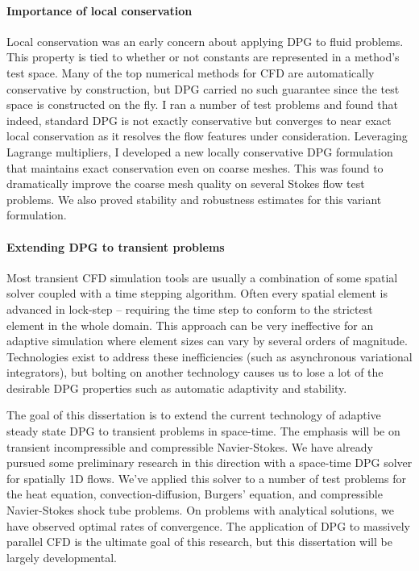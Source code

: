 \documentclass[letterpaper]{article}
\begin{document}
\paragraph{Importance of local conservation}
Local conservation was an early concern about applying DPG to fluid problems. 
This property is tied to whether or not constants are represented in a method's test space.
Many of the top numerical methods for CFD are automatically conservative by construction, 
but DPG carried no such guarantee since the test space is constructed on the fly.
I ran a number of test problems and found that indeed, standard DPG is not exactly conservative but converges to near exact local conservation 
as it resolves the flow features under consideration.
Leveraging Lagrange multipliers, I developed a new locally conservative DPG formulation\cite{Ellis2013Report} 
that maintains exact conservation even on coarse meshes.
This was found to dramatically improve the coarse mesh quality on several Stokes flow test problems.
We also proved stability and robustness estimates for this variant formulation.

\paragraph{Extending DPG to transient problems}
Most transient CFD simulation tools are usually a combination of some spatial solver coupled with a time stepping algorithm.
Often every spatial element is advanced in lock-step -- requiring the time step to conform to the strictest element in the whole domain.
This approach can be very ineffective for an adaptive simulation where element sizes can vary by several orders of magnitude.
Technologies exist to address these inefficiencies (such as asynchronous variational integrators\cite{Lew2003}), but bolting on another technology
causes us to lose a lot of the desirable DPG properties such as automatic adaptivity and stability.

The goal of this dissertation is to extend the current technology of adaptive steady state DPG to transient problems in space-time.
The emphasis will be on transient incompressible and compressible Navier-Stokes.
We have already pursued some preliminary research in this direction with a space-time DPG solver for spatially 1D flows.
We've applied this solver to a number of test problems for the heat equation, convection-diffusion, Burgers' equation, 
and compressible Navier-Stokes shock tube problems.
On problems with analytical solutions, we have observed optimal rates of convergence.
The application of DPG to massively parallel CFD is the ultimate goal of this research, but this dissertation will be largely developmental.
\end{document}
